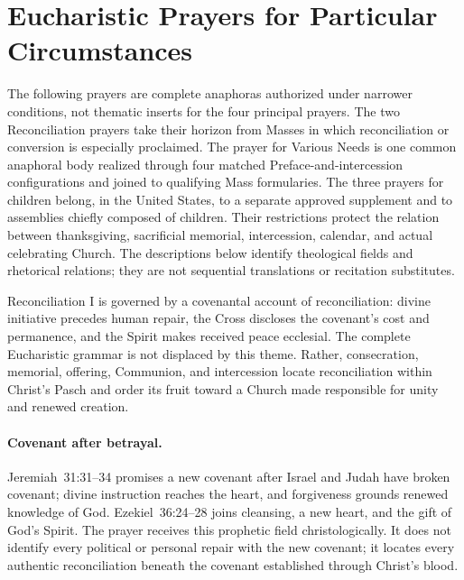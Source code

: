 \section{Eucharistic Prayers for Particular Circumstances}

The following prayers are complete anaphoras authorized under narrower conditions, not thematic inserts for the four principal prayers. The two Reconciliation prayers take their horizon from Masses in which reconciliation or conversion is especially proclaimed. The prayer for Various Needs is one common anaphoral body realized through four matched Preface-and-intercession configurations and joined to qualifying Mass formularies. The three prayers for children belong, in the United States, to a separate approved supplement and to assemblies chiefly composed of children. Their restrictions protect the relation between thanksgiving, sacrificial memorial, intercession, calendar, and actual celebrating Church. The descriptions below identify theological fields and rhetorical relations; they are not sequential translations or recitation substitutes.


Reconciliation I is governed by a covenantal account of reconciliation: divine initiative precedes human repair, the Cross discloses the covenant's cost and permanence, and the Spirit makes received peace ecclesial. The complete Eucharistic grammar is not displaced by this theme. Rather, consecration, memorial, offering, Communion, and intercession locate reconciliation within Christ's Pasch and order its fruit toward a Church made responsible for unity and renewed creation.

\paragraph{Covenant after betrayal.}
Jeremiah~31:31--34 promises a new covenant after Israel and Judah have broken covenant; divine instruction reaches the heart, and forgiveness grounds renewed knowledge of God. Ezekiel~36:24--28 joins cleansing, a new heart, and the gift of God's Spirit. The prayer receives this prophetic field christologically. It does not identify every political or personal repair with the new covenant; it locates every authentic reconciliation beneath the covenant established through Christ's blood.

